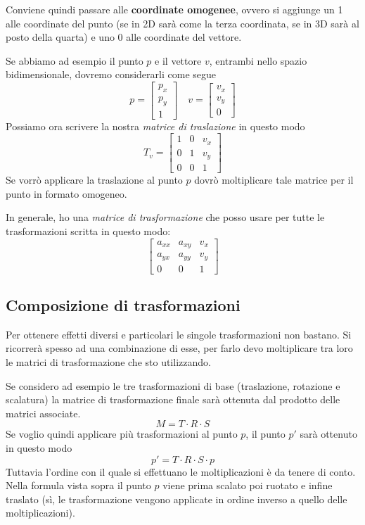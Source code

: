 Conviene quindi passare alle \textbf{coordinate omogenee}, ovvero si aggiunge un 1 alle
coordinate del punto (se in 2D sar\`a come la terza coordinata, se in 3D sar\`a al posto
della quarta) e uno 0 alle coordinate del vettore.

Se abbiamo ad esempio il punto $p$ e il vettore $v$, entrambi nello spazio bidimensionale,
dovremo considerarli come segue
\[
	p = \begin{bmatrix}
		p_x \\ p_y \\ 1
	\end{bmatrix} \quad
	v = \begin{bmatrix}
		v_x \\ v_y \\ 0
	\end{bmatrix}
\]
Possiamo ora scrivere la nostra \emph{matrice di traslazione} in questo modo
\[
	T_v = \begin{bmatrix}
		1 & 0 & v_x \\
		0 & 1 & v_y \\
		0 & 0 & 1
	\end{bmatrix}
\]
Se vorr\`o applicare la traslazione al punto $p$ dovr\`o moltiplicare tale matrice per il punto
in formato omogeneo.

In generale, ho una \emph{matrice di trasformazione} che posso usare per tutte le trasformazioni
scritta in questo modo:
\[
	\begin{bmatrix}
		a_{xx} & a_{xy} & v_x \\
		a_{yx} & a_{yy} & v_y \\
		0      & 0      & 1
	\end{bmatrix}
\]

\subsection{Composizione di trasformazioni}
Per ottenere effetti diversi e particolari le singole trasformazioni non bastano. Si ricorrer\`a
spesso ad una combinazione di esse, per farlo devo moltiplicare tra loro le matrici di
trasformazione che sto utilizzando.

Se considero ad esempio le tre trasformazioni di base (traslazione, rotazione e scalatura) la
matrice di trasformazione finale sar\`a ottenuta dal prodotto delle matrici associate.
\[ M = T \cdot R \cdot S \]
Se voglio quindi applicare pi\`u trasformazioni al punto $p$, il punto $p'$ sar\`a ottenuto in
questo modo
\[ p' = T \cdot R \cdot S \cdot p \]
Tuttavia l'ordine con il quale si effettuano le moltiplicazioni \`e da tenere di conto.
Nella formula vista sopra il punto $p$ viene prima scalato poi ruotato e infine traslato
(s\`i, le trasformazione vengono applicate in ordine inverso a quello delle moltiplicazioni).

